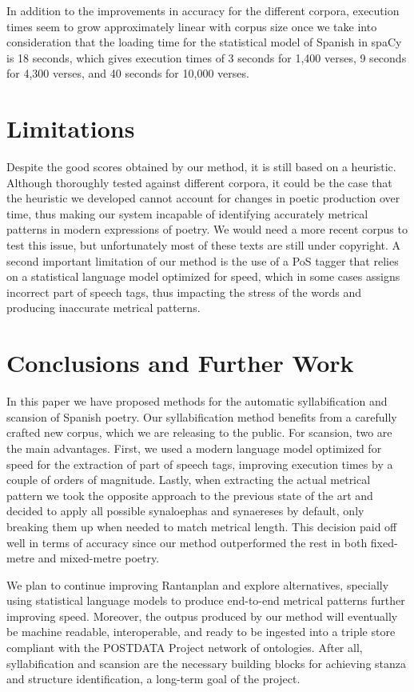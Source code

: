 \documentclass[a4paper,11pt,twocolumn,twoside]{article}
\begin{document}
In addition to the improvements in accuracy for the different corpora, execution times seem to grow approximately linear with corpus size once we take into consideration that the loading time for the statistical model of Spanish in spaCy is 18 seconds, which gives execution times of 3 seconds for 1,400 verses, 9 seconds for 4,300 verses, and 40 seconds for 10,000 verses.

\section{Limitations}
Despite the good scores obtained by our method, it is still based on a heuristic. Although thoroughly tested against different corpora, it could be the case that the heuristic we developed cannot account for changes in poetic production over time, thus making our system incapable of identifying accurately metrical patterns in modern expressions of poetry. We would need a more recent corpus to test this issue, but unfortunately most of these texts are still under copyright. A second important limitation of our method is the use of a PoS tagger that relies on a statistical language model optimized for speed, which in some cases assigns incorrect part of speech tags, thus impacting the stress of the words and producing inaccurate metrical patterns.

\section{Conclusions and Further Work}
In this paper we have proposed methods for the automatic syllabification and scansion of Spanish poetry. Our syllabification method benefits from a carefully crafted new corpus, which we are releasing to the public. For scansion, two are the main advantages. First, we used a modern language model optimized for speed for the extraction of part of speech tags, improving execution times by a couple of orders of magnitude. Lastly, when extracting the actual metrical pattern we took the opposite approach to the previous state of the art and decided to apply all possible synaloephas and synaereses by default, only breaking them up when needed to match metrical length. This decision paid off  well in terms of accuracy since our method outperformed the rest in both fixed-metre and mixed-metre poetry.

We plan to continue improving Rantanplan and explore alternatives, specially using statistical language models to produce end-to-end metrical patterns further improving speed. Moreover, the outpus produced by our method will eventually be machine readable, interoperable, and ready to be ingested into a triple store compliant with the POSTDATA Project network of ontologies. After all, syllabification and scansion are the necessary building blocks for achieving stanza and structure identification, a long-term goal of the project.
\end{document}
